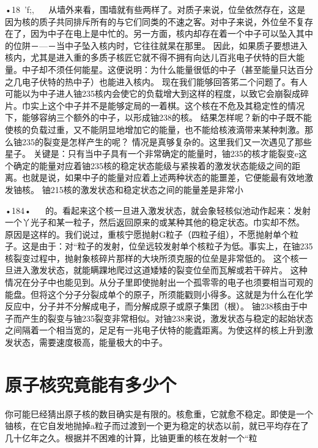 •18~'f;,
  
从墙外来看，围墙就有些两样了。对质子来说，位垒依然存在，这是因为核的质子共同排斥所有的与它们同类的不速之客。对中子来说，外位垒不复存在了，因为中子在电上是中忙的。另一方面，核内却存在着一个中子可以坠入其中的位阱－—－当中子坠入核内时，它往往就杲在那里。
因此，如果质子要想进入核内，尤其是进入重的多质子核匠它就不得不拥有向达儿百兆电子伏特的巨大能量。中子却不须任何能星。这便说明：为什么能量很低的中子（甚至能量只达百分之几电子伏特的热中子）也能进入核内。
现在我们能够回答笫二个问题了。有人可能以为中子进人铀235核内会使它的负载增大到这样的程度，以致它会崩裂成碎片。巾实上这个中子并不是能够定局的一着棋。这个核在不危及其稳定性的情况下，能够容纳三个额外的中子，以形成铀238的核。
结果怎样呢？新的中子既不能使核的负载过重，又不能阴显地增加它的能量，也不能给核液滴带来某种刺激。那么铀235的裂变是怎样产生的呢？
情况是真够复杂的。这里我们又一次遇见了那些星子。
关键是：只有当中子具有一个非常确定的能量时，铀235的核才能裂变e这个确定的能量对应着铀235核的稳定状态能级与紧挨着的激发状态能级之间的距离。也就是说，如果中子的能量对应着上述两种状态的能噩差，它便能最有效地激发铀核。
铀215核的激发状态和稳定状态之间的能量差是非常小

•184•
  
的。看起来这个核一旦进入激发状态，就会象轻核似池动作起来：发射一个丫光子和某一粒子，然后返回原来的或某种其他的稳定状态。巾实却不然。
原因是这样的。我们说过，重核宁愿抛射G粒子（四粒子组），不愿抛射单个粒子。这是由于：对“粒子的发射，位垒远较发射单个核粒子为低。事实上，在铀235核裂变过程中，抛射象核碎片那样的大块所须克服的位垒是非常低的。
这个核一旦进入激发状态，就能瞒踝地爬过这道矮矮的裂变位垒而瓦解或若干碎片。
这种情况在分子中也能见到。从分子里即使抛射出一个孤零零的电子也须要相当可观的能盘。但将这个分子分裂成单个的原子，所须能戳则小得多。这就是为什么在化学反应中，分子并不分解成电子，而分解成原子或原子集团（根）。
铀238核由于中子而产生的裂变与铀235裂变非常相似。对铀238来说，激发状态与稳定的起始状态之间隔着一个相当宽的，足足有一兆电子伏特的能蠹距离。为使这样的核上升到激发状态，需要速度极高，能量极大的中子。

\section{原子核究竟能有多少个}
你可能巳经猜出原子核的数目确实是有限的。核愈重，它就愈不稳定。即使是一个铀核，在它自发地抛掉a粒子而过渡到一个更为稳定的状态以前，就已平均存在了几十亿年之久。根据并不困难的计算，比铀更重的核在发射一个“粒

